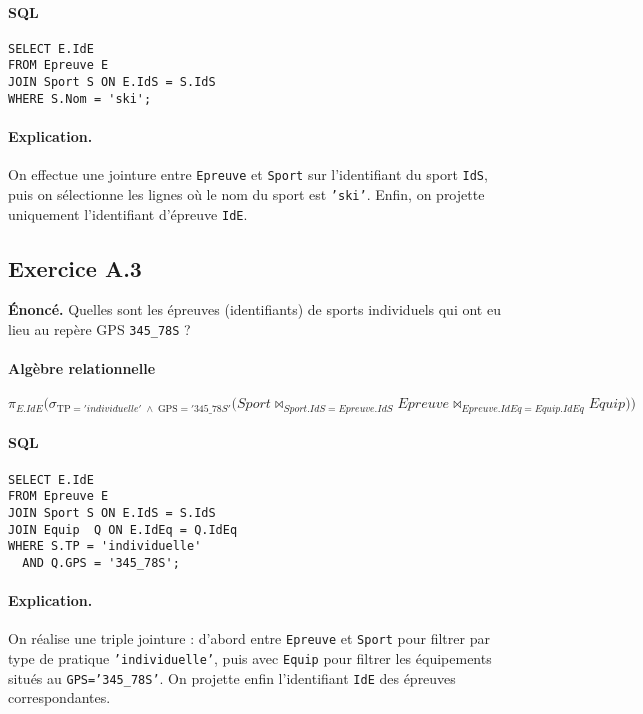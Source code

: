 \documentclass[11pt]{article}
\begin{document}
\paragraph{SQL}
\begin{verbatim}
SELECT E.IdE
FROM Epreuve E
JOIN Sport S ON E.IdS = S.IdS
WHERE S.Nom = 'ski';
\end{verbatim}

\paragraph{Explication.}
On effectue une jointure entre \texttt{Epreuve} et \texttt{Sport} sur l'identifiant du sport \texttt{IdS}, puis on sélectionne les lignes où le nom du sport est \texttt{'ski'}. Enfin, on projette uniquement l'identifiant d'épreuve \texttt{IdE}.

\subsection*{Exercice A.3}
\textbf{Énoncé.} Quelles sont les épreuves (identifiants) de sports individuels qui ont eu lieu au repère GPS \texttt{345\_78S} ?\\

\paragraph{Algèbre relationnelle}
\[
\pi_{E.IdE}\bigl(
  \sigma_{\text{TP}='individuelle'\;\wedge\;\text{GPS}='345\_78S'}
    \bigl(Sport \bowtie_{Sport.IdS = Epreuve.IdS} Epreuve \bowtie_{Epreuve.IdEq = Equip.IdEq} Equip\bigr)
\bigr)
\]

\paragraph{SQL}
\begin{verbatim}
SELECT E.IdE
FROM Epreuve E
JOIN Sport S ON E.IdS = S.IdS
JOIN Equip  Q ON E.IdEq = Q.IdEq
WHERE S.TP = 'individuelle'
  AND Q.GPS = '345_78S';
\end{verbatim}

\paragraph{Explication.}
On réalise une triple jointure : d'abord entre \texttt{Epreuve} et \texttt{Sport} pour filtrer par type de pratique \texttt{'individuelle'}, puis avec \texttt{Equip} pour filtrer les équipements situés au \texttt{GPS='345\_78S'}. On projette enfin l'identifiant \texttt{IdE} des épreuves correspondantes.
\end{document}
